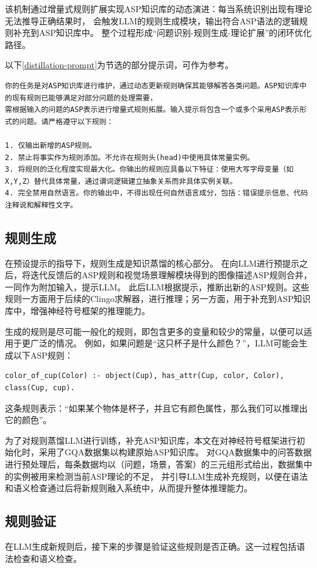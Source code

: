 该机制通过增量式规则扩展实现ASP知识库的动态演进：每当系统识别出现有理论无法推导正确结果时，
会触发LLM的规则生成模块，输出符合ASP语法的逻辑规则补充到ASP知识库中。
整个过程形成“问题识别-规则生成-理论扩展”的闭环优化路径。

以下\ref{distillation-prompt}为节选的部分提示词，可作为参考。
\begin{lstlisting}[label=distillation-prompt]
你的任务是对ASP知识库进行维护，通过动态更新规则确保其能够解答各类问题。ASP知识库中的现有规则已能够满足对部分问题的处理需要，
需根据输入的问题的ASP表示进行增量式规则拓展。输入提示将包含一个或多个采用ASP表示形式的问题。请严格遵守以下规则：

1. 仅输出新增的ASP规则。
2. 禁止将事实作为规则添加。不允许在规则头(head)中使用具体常量实例。
3. 将规则的泛化程度实现最大化。你输出的规则应具备以下特征：使用大写字母变量（如X,Y,Z）替代具体常量，通过谓词逻辑建立抽象关系而非具体实例关联。
4. 完全禁用自然语言。你的输出中，不得出现任何自然语言成分，包括：错误提示信息、代码注释说和解释性文字。
\end{lstlisting}
\subsection{规则生成}
在预设提示的指导下，规则生成是知识蒸馏的核心部分。
在向LLM进行预提示之后，将迭代反馈后的ASP规则和视觉场景理解模块得到的图像描述ASP规则合并，一同作为附加输入，提示LLM。
此后LLM根据提示，推断出新的ASP规则。这些规则一方面用于后续的Clingo求解器，进行推理；另一方面，用于补充到ASP知识库中，增强神经符号框架的推理能力。

生成的规则是尽可能一般化的规则，即包含更多的变量和较少的常量，以便可以适用于更广泛的情况。
例如，如果问题是“这只杯子是什么颜色？”，LLM可能会生成以下ASP规则：
\begin{lstlisting}
color_of_cup(Color) :- object(Cup), has_attr(Cup, color, Color), class(Cup, cup).
\end{lstlisting}
这条规则表示：“如果某个物体是杯子，并且它有颜色属性，那么我们可以推理出它的颜色”。

为了对规则蒸馏LLM进行训练，补充ASP知识库，本文在对神经符号框架进行初始化时，采用了GQA数据集以构建原始ASP知识库。
对GQA数据集中的问答数据进行预处理后，每条数据均以（问题，场景，答案）的三元组形式给出，数据集中的实例被用来检测当前ASP理论的不足，
并引导LLM生成补充规则，以便在语法和语义检查通过后将新规则融入系统中，从而提升整体推理能力。 
\subsection{规则验证}
在LLM生成新规则后，接下来的步骤是验证这些规则是否正确。这一过程包括语法检查和语义检查。


